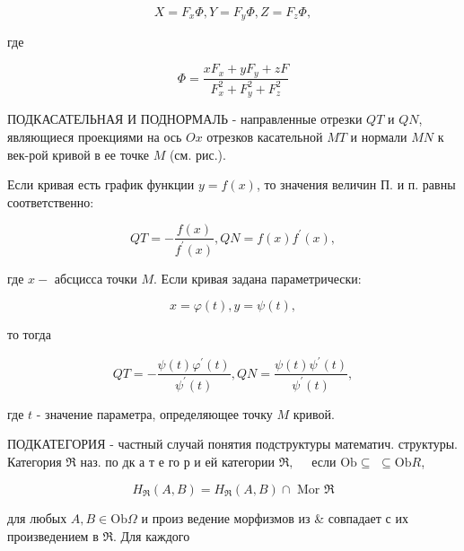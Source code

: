 \documentclass[10pt]{article}
\begin{document}
\[

X=F_{x} \Phi, Y=F_{y} \Phi, Z=F_{z} \Phi,

\]



где



\[

\Phi=\frac{x F_{x}+y F_{y}+z F}{F_{x}^{2}+F_{y}^{2}+F_{z}^{2}}

\]



ПОДКАСАТЕЛЬНАЯ И ПОДНОРМАЛЬ - направленные отрезки $Q T$ и $Q N$, являющиеся проекциями на ось $O x$ отрезков касательной $M T$ и нормали $M N$ к век-рой кривой в ее точке $M$ (см. рис.).



Если кривая есть график функции $y=f(x)$, то значения величин П. и п. равны соответственно:



\[

Q T=-\frac{f(x)}{f^{\prime}(x)}, Q N=f(x) f^{\prime}(x),

\]



где $x-$ абсцисса точки $M$. Если кривая задана параметрически:



\[

x=\varphi(t), y=\psi(t),

\]



то тогда



\[

Q T=-\frac{\psi(t) \varphi^{\prime}(t)}{\psi^{\prime}(t)}, Q N=\frac{\psi(t) \psi^{\prime}(t)}{\psi^{\prime}(t)},

\]



где $t$ - значение параметра, определяющее точку $M$ кривой.



ПОДКАТЕГОРИЯ - частный случай понятия подструктуры математич. структуры. Категория $\mathfrak{R}$ наз. по дк а т е го р и ей категории $\Re, \quad$ если $\mathrm{Ob} \subseteq$ $\subseteq \mathrm{Ob} R$,



\[

H_{\mathfrak{R}}(A, B)=H_{\Re}(A, B) \cap \text { Mor } \mathfrak{R}

\]



для любых $A, B \in \mathrm{Ob} \mathfrak{\Omega}$ и произ ведение морфизмов из \& совпадает с их произведением в $\Re$. Для каждого
\end{document}
